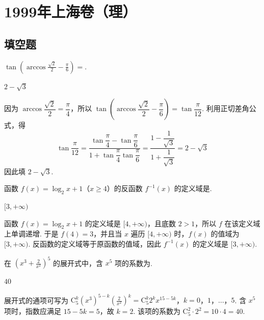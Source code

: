 \chapter{1999年上海卷（理）}
\section{填空题}

\begin{problem}
\(\tan\left(\arccos \frac{\sqrt{2}}{2} - \frac{\pi}{6}\right)=\)\fillinblank{}.
\end{problem}

\begin{answer}
\(2-\sqrt{3}\)
\end{answer}

\begin{solution}
因为 \(\arccos\dfrac{\sqrt2}{2}=\dfrac\pi4\)，所以
\(\tan\left(\arccos\dfrac{\sqrt2}{2}-\dfrac\pi6\right)=\tan\dfrac\pi{12}\). 利用正切差角公式，得
\[
\tan\dfrac\pi{12}=\frac{\tan\dfrac\pi4-\tan\dfrac\pi6}{1+\tan\dfrac\pi4\tan\dfrac\pi6}=\frac{1-\dfrac1{\sqrt3}}{1+\dfrac1{\sqrt3}}=2-\sqrt3
\]
因此填 \(2-\sqrt3\).
\end{solution}

\begin{problem}
函数 \(f(x)=\log_2 x+1\)（\(x\geqslant 4\)）的反函数 \(f^{-1}(x)\) 的定义域是\fillinblank{}.
\end{problem}

\begin{answer}
\([3,+\infty)\)
\end{answer}

\begin{solution}
函数 \(f(x)=\log_2x+1\) 的定义域是 \([4,+\infty)\)，且底数 \(2>1\)，所以 \(f\) 在该定义域上单调递增. 于是 \(f(4)=3\)，并且当 \(x\) 遍历 \([4,+\infty)\) 时，\(f(x)\) 的值域为 \([3,+\infty)\). 反函数的定义域等于原函数的值域，因此 \(f^{-1}(x)\) 的定义域是 \([3,+\infty)\).
\end{solution}

\begin{problem}
在 \(\left( x^3 + \frac{2}{x^2} \right)^5\) 的展开式中，含 \(x^5\) 项的系数为\fillinblank{}.
\end{problem}

\begin{answer}
\(40\)
\end{answer}

\begin{solution}
展开式的通项可写为
\(\mathrm C_5^k(x^3)^{5-k}\left(\frac2{x^2}\right)^k=\mathrm C_5^k2^k x^{15-5k}\)，\(k=0\)，\(1\)，\(\ldots\)，\(5\).
含 \(x^5\) 项时，指数应满足 \(15-5k=5\)，故 \(k=2\). 该项的系数为 \(\mathrm C_5^2\cdot2^2=10\cdot4=40\).
\end{solution}

